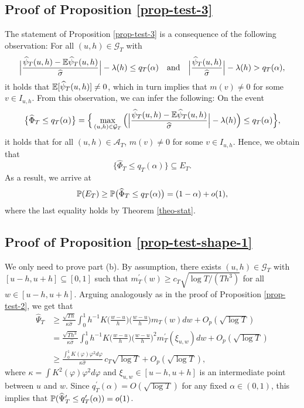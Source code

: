 \subsection*{Proof of Proposition \ref{prop-test-3}}

 
The statement of Proposition \ref{prop-test-3} is a consequence of the following observation: For all $(u,h) \in \mathcal{G}_T$ with 
\[ \Big|\frac{\widehat{\psi}_T(u,h) - \mathbb{E} \widehat{\psi}_T(u,h)}{\widehat{\sigma}}\Big| - \lambda(h) \le q_T(\alpha) \quad \text{and} \quad \Big|\frac{\widehat{\psi}_T(u,h)}{\widehat{\sigma}}\Big| - \lambda(h) > q_T(\alpha), \]
it holds that $\mathbb{E}[\widehat{\psi}_T(u,h)] \ne 0$, which in turn implies that $m(v) \ne 0$ for some $v \in I_{u,h}$. From this observation, we can infer the following: On the event 
\[ \big\{ \widehat{\Phi}_T \le q_T(\alpha) \big\} = \Big\{ \max_{(u,h) \in \mathcal{G}_T} \Big( \Big|\frac{\widehat{\psi}_T(u,h) - \mathbb{E} \widehat{\psi}_T(u,h)}{\widehat{\sigma}}\Big| - \lambda(h) \Big) \le q_T(\alpha) \Big\}, \]
it holds that for all $(u,h) \in \mathcal{A}_T$, 
$m(v) \ne 0$ for some $v \in I_{u,h}$. Hence, we obtain that 
\[ \big\{ \widehat{\Phi}_T \le q_T(\alpha) \big\} \subseteq E_T. \]
As a result, we arrive at  
\[ \mathbb{P}(E_T) \ge \mathbb{P} \big(  \widehat{\Phi}_T \le q_T(\alpha) \big) = (1-\alpha) + o(1), \]
where the last equality holds by Theorem \ref{theo-stat}.



\subsection*{Proof of Proposition \ref{prop-test-shape-1}}


We only need to prove part (b). By assumption, there exists $(u,h) \in \mathcal{G}_T$ with $[u-h,u+h] \subseteq [0,1]$ such that $m_T^\prime(w) \ge c_T \sqrt{\log T/(Th^3)}$ for all $w \in [u-h,u+h]$. Arguing analogously as in the proof of Proposition \ref{prop-test-2}, we get that 
\begin{align*}
\widehat{\Psi}_T 
 & \ge \frac{\sqrt{Th}}{\kappa \widehat{\sigma}} \int_0^1 h^{-1} K\Big(\frac{w-u}{h}\Big) \Big(\frac{w-u}{h}\Big) m_T(w) dw + O_p(\sqrt{\log T}) \\
 & = \frac{\sqrt{Th^3}}{\kappa \widehat{\sigma}} \int_0^1 h^{-1} K\Big(\frac{w-u}{h}\Big) \Big(\frac{w-u}{h}\Big)^2 m_T^\prime(\xi_{u,w}) dw + O_p(\sqrt{\log T}) \\[0.1cm]
 & \ge \frac{\int_0^1 K(\varphi) \varphi^2 d\varphi}{\kappa \widehat{\sigma}} \, c_T \sqrt{\log T} + O_p(\sqrt{\log T}),
\end{align*}  
where $\kappa = \int K^2(\varphi) \varphi^2 d\varphi$ and $\xi_{u,w} \in [u-h,u+h]$ is an intermediate point between $u$ and $w$. Since $q_T^\prime(\alpha) = O(\sqrt{\log T})$ for any fixed $\alpha \in (0,1)$, this implies that $\mathbb{P}(\widehat{\Psi}_T^\prime \le q_T^\prime(\alpha)) = o(1)$. 



